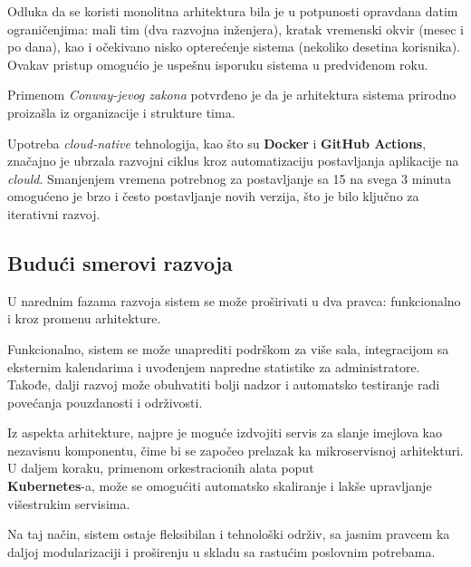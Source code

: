\documentclass[12pt]{article}
\begin{document}
    Odluka da se koristi monolitna arhitektura bila je u potpunosti opravdana datim ograničenjima: mali tim (dva razvojna inženjera), kratak vremenski okvir (mesec i po dana), kao i očekivano nisko opterećenje sistema (nekoliko desetina korisnika). Ovakav pristup omogućio je uspešnu isporuku sistema u predviđenom roku.

    Primenom \textit{Conway-jevog zakona} potvrđeno je da je arhitektura sistema prirodno proizašla 
    iz organizacije i strukture tima.

    Upotreba \textit{cloud-native} tehnologija, kao što su \textbf{Docker} i \textbf{GitHub Actions}, značajno je ubrzala 
    razvojni ciklus kroz automatizaciju postavljanja aplikacije na \textit{clould}. Smanjenjem vremena 
    potrebnog za postavljanje sa 15 na svega 3 minuta omogućeno je brzo i često postavljanje novih 
    verzija, što je bilo ključno za iterativni razvoj.

    \newpage
    \subsection*{Budući smerovi razvoja}

    U narednim fazama razvoja sistem se može proširivati u dva pravca: funkcionalno i kroz promenu arhitekture.

    Funkcionalno, sistem se može unaprediti podrškom za više sala, integracijom sa eksternim kalendarima i uvođenjem napredne statistike za administratore. Takođe, dalji razvoj može obuhvatiti bolji nadzor i automatsko testiranje radi povećanja pouzdanosti i održivosti.

    Iz aspekta arhitekture, najpre je moguće izdvojiti servis za slanje imejlova kao nezavisnu 
    komponentu, čime bi se započeo prelazak ka mikroservisnoj arhitekturi. U daljem koraku, primenom 
    orkestracionih alata poput \\ \textbf{Kubernetes}-a, može se omogućiti automatsko skaliranje i lakše upravljanje višestrukim servisima.

    Na taj način, sistem ostaje fleksibilan i tehnološki održiv, sa jasnim pravcem ka daljoj modularizaciji i proširenju u skladu sa rastućim poslovnim potrebama.




\newpage
\printbibliography[title={Literatura}]
\end{document}
